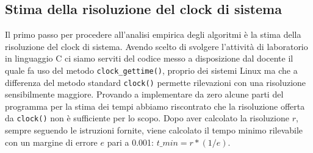 \documentclass{article}
\begin{document}
\subsection{Stima della risoluzione del clock di sistema}
Il primo passo per procedere all'analisi empirica degli algoritmi è la stima della risoluzione del clock di sistema.
\newline
\newline
Avendo scelto di svolgere l'attività di laboratorio in linguaggio C ci siamo serviti del codice messo a disposizione dal docente il quale fa uso del metodo \texttt{clock_gettime()}, proprio dei sistemi Linux ma che a differenza del metodo standard \texttt{clock()} permette rilevazioni con una risoluzione sensibilmente maggiore.
\newline
\newline
Provando a implementare da zero alcune parti del programma per la stima dei tempi abbiamo riscontrato che la risoluzione offerta da \texttt{clock()} non è sufficiente per lo scopo.
\newline
\newline
Dopo aver calcolato la risoluzione $r$, sempre seguendo le istruzioni fornite, viene calcolato il tempo minimo rilevabile con un margine di errore $e$ pari a 0.001: $t\_min = r * (1/e)$.
\end{document}
